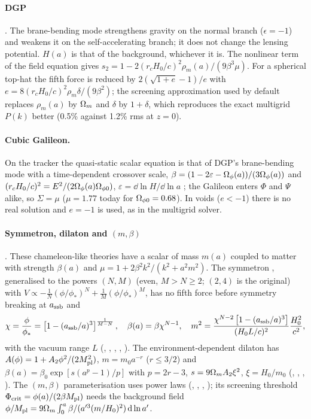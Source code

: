 \paragraph*{DGP} \cite{KoyamaMaartens2006}. The brane-bending mode strengthens gravity on the normal branch
($\epsilon=-1$) and weakens it on the self-accelerating branch; it does not change the lensing potential. $H(a)$ is
that of the background, whichever it is. The nonlinear term of the field equation gives
$s_2=1-2(r_cH_0/c)^2\rho_m(a)/(9\beta^3\mu)$. For a spherical top-hat the fifth force is reduced by
$2(\sqrt{1+e}-1)/e$ with $e=8(r_cH_0/c)^2\rho_m\delta/(9\beta^2)$; the screening approximation used by default replaces
$\rho_m(a)$ by $\Omega_m$ and $\delta$ by $1+\delta$, which reproduces the exact multigrid $P(k)$ better (0.5\% against
1.2\% rms at $z=0$).

\paragraph*{Cubic Galileon.} On the tracker the quasi-static scalar equation is that of DGP's brane-bending mode
with a time-dependent crossover scale, $\beta=(1-2\varepsilon-\Omega_\phi(a))/(3\Omega_\phi(a))$ and
$(r_cH_0/c)^2=E^2/(2\Omega_\phi(a)\Omega_{\phi0})$, $\varepsilon=\dd\ln H/\dd\ln a$ \cite{Barreira2013}; the Galileon enters
$\Phi$ and $\Psi$ alike, so $\Sigma=\mu$ ($\mu=1.77$ today for $\Omega_{\phi0}=0.68$). In voids ($e<-1$) there is no real
solution and $e=-1$ is used, as in the multigrid solver.

\paragraph*{Symmetron, dilaton and $(m,\beta)$} \cite{Brax2012}. These chameleon-like theories have a scalar of mass
$m(a)$ coupled to matter with strength $\beta(a)$ and $\mu=1+2\beta^2k^2/(k^2+a^2m^2)$. The symmetron
\cite{Brax2012}, generalised to the powers $(N,M)$ (even, $M>N\ge2$; $(2,4)$ is the original) with
$V\propto-\frac1N(\phi/\phi_*)^N+\frac1M(\phi/\phi_*)^M$, has no fifth force before symmetry breaking at $a_{\rm ssb}$ and
\begin{equation}
\chi=\frac{\phi}{\phi_*}=\left[1-(a_{\rm ssb}/a)^3\right]^{\frac{1}{M-N}},\quad \beta(a)=\beta\chi^{N-1},\quad
m^2=\frac{\chi^{N-2}\left[1-(a_{\rm ssb}/a)^3\right]}{(H_0L/c)^2}\frac{H_0^2}{c^2},
\end{equation}
with the vacuum range $L$ (, , , , ). The
environment-dependent dilaton has $A(\phi)=1+A_2\phi^2/(2M_{\rm pl}^2)$, $m=m_0a^{-r}$ ($r\le3/2$) and
$\beta(a)=\beta_0\exp[s(a^p-1)/p]$ with $p=2r-3$, $s=9\Omega_mA_2\xi^2$, $\xi=H_0/m_0$ (,
, , ). The $(m,\beta)$ parameterisation uses power laws
(, , , ); its screening threshold
$\Phi_{\rm crit}=\phi(a)/(2\beta M_{\rm pl})$ needs the background field $\phi/M_{\rm pl}=9\Omega_m\int_0^a\beta/(a'^3(m/H_0)^2)\,
\mathrm{d}\ln a'$.

